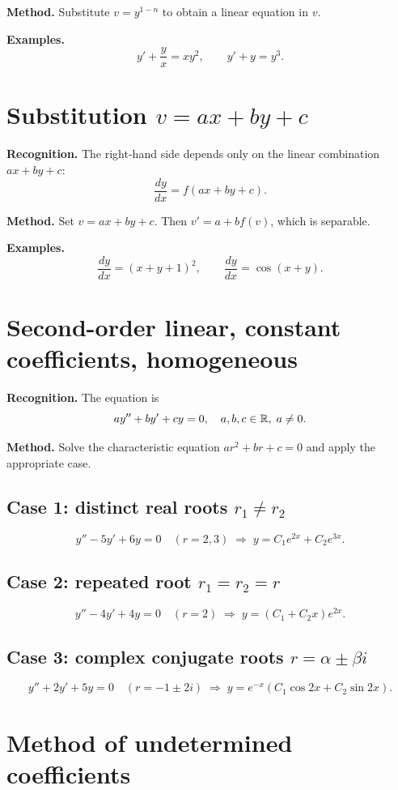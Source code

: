 \documentclass{essay}
\begin{document}
\textbf{Method.}  Substitute \(v = y^{1-n}\) to obtain a linear equation in \(v\).

\textbf{Examples.}
\[ y' + \frac{y}{x} = xy^{2}, \qquad y' + y = y^{3}. \]

\section{Substitution \(v = ax + by + c\)}

\textbf{Recognition.}  The right-hand side depends only on the linear combination \(ax+by+c\):
\[ \frac{dy}{dx} = f(ax + by + c). \]

\textbf{Method.}  Set \(v = ax + by + c\).  Then \(v' = a + b f(v)\), which is separable.

\textbf{Examples.}
\[ \frac{dy}{dx} = (x + y + 1)^{2}, \qquad \frac{dy}{dx} = \cos(x+y). \]

\section{Second-order linear, constant coefficients, homogeneous}

\textbf{Recognition.}  The equation is
\[ ay'' + by' + cy = 0, \quad a,b,c \in \mathbb{R}, \; a \neq 0. \]

\textbf{Method.}  Solve the characteristic equation \(ar^{2} + br + c = 0\) and apply the appropriate case.

\subsection*{Case 1: distinct real roots \(r_{1} \neq r_{2}\)}
\[ y'' - 5y' + 6y = 0 \quad (r = 2, 3) \;\Rightarrow\; y = C_{1} e^{2x} + C_{2} e^{3x}. \]

\subsection*{Case 2: repeated root \(r_{1} = r_{2} = r\)}
\[ y'' - 4y' + 4y = 0 \quad (r = 2) \;\Rightarrow\; y = (C_{1} + C_{2} x)e^{2x}. \]

\subsection*{Case 3: complex conjugate roots \(r = \alpha \pm \beta i\)}
\[ y'' + 2y' + 5y = 0 \quad (r = -1 \pm 2i) \;\Rightarrow\; y = e^{-x}(C_{1}\cos 2x + C_{2} \sin 2x). \]

\section{Method of undetermined coefficients}
\end{document}
